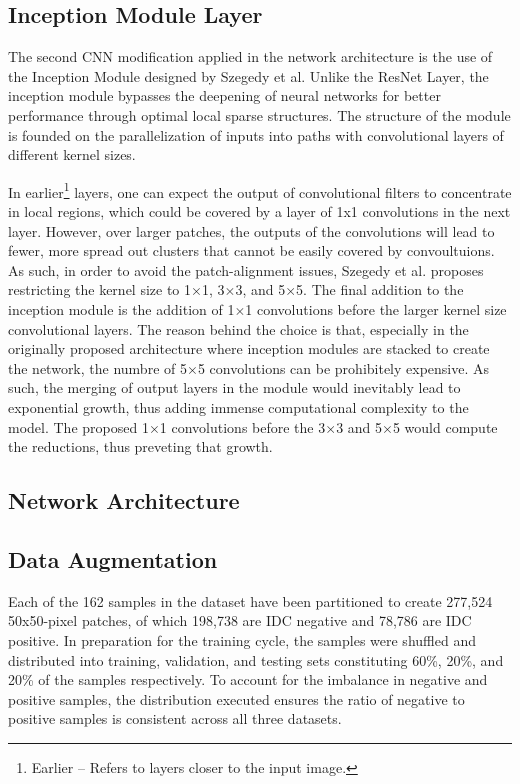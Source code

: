 \documentclass[conference]{IEEEtran}
\begin{document}
\subsection{Inception Module Layer}
The second CNN modification applied in the network architecture is the use of the Inception Module \cite{Szegedy2014} designed by Szegedy et al. Unlike the ResNet Layer, the inception module bypasses the deepening of neural networks for better performance through optimal local sparse structures. The structure of the module is founded on the parallelization of inputs into paths with convolutional layers of different kernel sizes.

In earlier\footnote{Earlier -- Refers to layers closer to the input image.} layers, one can expect the output of convolutional filters to concentrate in local regions, which could be covered by a layer of 1x1 convolutions in the next layer. However, over larger patches, the outputs of the convolutions will lead to fewer, more spread out clusters that cannot be easily covered by convoultuions. As such, in order to avoid the patch-alignment issues, Szegedy et al. proposes restricting the kernel size to 1$\times$1, 3$\times$3, and 5$\times$5. The final addition to the inception module is the addition of 1$\times$1 convolutions before the larger kernel size convolutional layers. The reason behind the choice is that, especially in the originally proposed architecture where inception modules are stacked to create the network, the numbre of 5$\times$5 convolutions can be prohibitely expensive. As such, the merging of output layers in the module would inevitably lead to exponential growth, thus adding immense computational complexity to the model. The proposed 1$\times$1 convolutions before the 3$\times$3 and 5$\times$5 would compute the reductions, thus preveting that growth.



\subsection{Network Architecture}
\subsection{Data Augmentation}
Each of the 162 samples in the dataset have been partitioned to create 277,524 50x50-pixel patches, of which 198,738 are IDC negative and 78,786 are IDC positive. In preparation for the training cycle, the samples were shuffled and distributed into training, validation, and testing sets constituting 60\%, 20\%, and 20\% of the samples respectively. To account for the imbalance in negative and positive samples, the distribution executed ensures the ratio of negative to positive samples is consistent across all three datasets.
\end{document}
